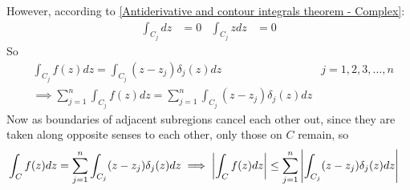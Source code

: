 \documentclass[12pt, english]{book}
\makeatletter
\renewenvironment{proof}[1][\proofname]{\par
	\pushQED{\qed}%
	\normalfont \topsep6\p@\@plus6\p@\relax
	\list{}{%
		\settowidth{\leftmargin}{\itshape\proofname:\hskip\labelsep}%
		\setlength{\labelwidth}{0pt}%
		\setlength{\itemindent}{-\leftmargin}%
	}%
	\item[\hskip\labelsep\itshape#1\@addpunct{:}]\ignorespaces
	}{ \popQED\endlist\@endpefalse}
\makeatother
\begin{document}
\begin{proof}
		However, according to \cref{Antiderivative and contour integrals theorem - Complex}:
		\begin{align*}
			\int_{C_j} dz &= 0 & \int_{C_j} z dz &= 0
		\end{align*}
		So
		\begin{align*}
			&\int_{C_j} f(z) dz = \int_{C_j} (z - z_j) \delta_j(z) dz & j = 1, 2, 3, \ldots, n \\
			&\implies \sum_{j=1}^{n} \int_{C_j} f(z) dz  = \sum_{j=1}^{n} \int_{C_j} (z - z_j) \delta_j (z) dz
		\end{align*}
		Now as boundaries of adjacent subregions cancel each other out, since they are taken along opposite senses to each other, only those on \(C\) remain, so
		\begin{align*}
			&\int_{C} f(z) dz = \sum_{j=1}^{n} \int_{C_j} (z - z_j) \delta_j (z) dz  
			\implies \abs{\int_{C} f(z) dz} \leq \sum_{j=1}^{n} \abs{\int_{C_j} (z - z_j) \delta_j (z) dz}
		\end{align*}
	

\end{proof}
\end{document}
